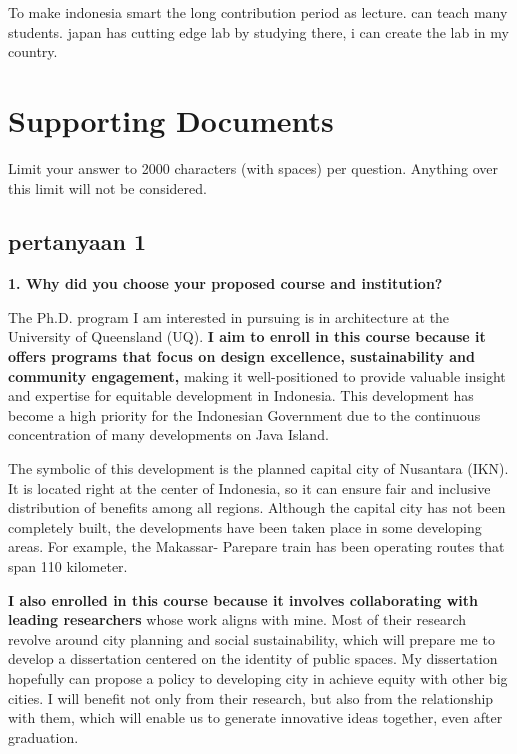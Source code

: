 \documentclass[../main.tex]{subfiles}
\begin{document}
To make indonesia smart
the long contribution period as lecture.
can teach many students.
japan has cutting edge lab
by studying there, i can create the lab in my country.


\section{Supporting Documents}%
\label{sec:Supporting Documents}

Limit your answer to 2000 characters (with spaces) per question. Anything over this limit will not be considered.

\subsection*{pertanyaan 1}%
\label{sub:pertanyaan 1}

\textbf{1. Why did you choose your proposed course and institution?}

The Ph.D. program I am interested in pursuing is in architecture at the University of Queensland (UQ).
\textbf{I aim to enroll in this course because it offers programs that focus on design excellence, sustainability and community engagement,} making it well-positioned to provide valuable insight and expertise for equitable development in Indonesia.
This development has become a high priority for the Indonesian Government due to the continuous concentration of many developments on Java Island.

The symbolic of this development is the planned capital city of Nusantara (IKN).
It is located right at the center of Indonesia, so it can ensure fair and inclusive distribution of benefits among all regions.
Although the capital city has not been completely built, the developments have been taken place in some developing areas. For example, the Makassar- Parepare train has been operating routes that span 110 kilometer.

\textbf{I also enrolled in this course because it involves collaborating with leading researchers} whose work aligns with mine.
Most of their research revolve around city planning and social sustainability, which will prepare me to develop a dissertation centered on the identity of public spaces.
My dissertation hopefully can propose a policy to developing city in achieve equity with other big cities.
I will benefit not only from their research, but also from the relationship with them, which will enable us to generate innovative ideas together, even after graduation.
\end{document}
